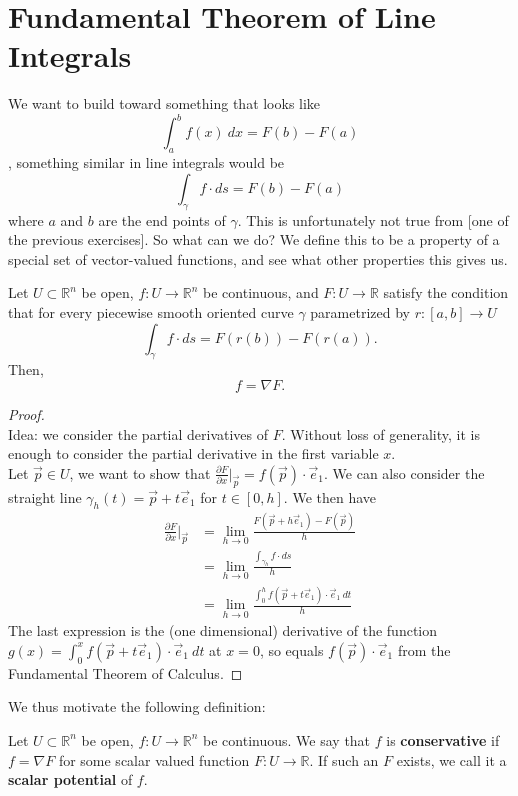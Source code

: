 \documentclass[11pt,openany]{book}
\newcommand{\definition}[2]{\begin{tcolorbox}[title=Definition ({#1}),colframe=black]{#2}\end{tcolorbox}
}
\newcommand{\proposition}[1]{\begin{tcolorbox}[title=Proposition,colframe=red!50!blue!20!white,colback=red!35!blue!10!white, coltitle=black]{#1}\end{tcolorbox}
}
\begin{document}
	\section*{Fundamental Theorem of Line Integrals}
	We want to build toward something that looks like 
	\[
		\int_{a}^{b} f(x) \ dx = F(b) - F(a)
	\], something similar in line integrals would be \[
		\int_\gamma f \cdot ds = F(b) - F(a)
	\] where $a$ and $b$ are the end points of $\gamma$. This is unfortunately not true from [one of the previous exercises]. So what can we do? We define this to be a property of a special set of vector-valued functions, and see what other properties this gives us.
	
	
	\proposition{
		Let $U\subset\mathbb{R}^n$ be open, $f:U\to\mathbb{R}^n$ be continuous, and $F:U\to\mathbb{R}$ satisfy the condition that for every piecewise smooth oriented curve $\gamma$ parametrized by $r: [a,b]\to U$
		\[
		\int_\gamma f \cdot ds = F(r(b)) - F(r(a)).
		\] 
		Then, \[
			f = \nabla F.
		\]
	}
	\begin{proof} \ \\
		Idea: we consider the partial derivatives of $F$. Without loss of generality, it is enough to consider the partial derivative in the first variable $x$. \\
		Let $\vec{p} \in U$, we want to show that $\frac{\partial F}{\partial x} \big| _{\vec{p}} = f(\vec{p}) \cdot \vec{e}_1$. We can also consider the straight line $\gamma_h(t) = \vec{p} + t\vec{e}_1$ for $t\in[0,h]$. We then have \begin{align*}
			\frac{\partial F}{\partial x} \big| _{\vec{p}} &= \lim_{h\to 0} \frac{F(\vec{p}+h\vec{e}_1)-F(\vec{p})}{h} \\
			&= \lim_{h\to 0} \frac{\int_{\gamma_h} f \cdot ds}{h}\\
			&= \lim_{h\to 0} \frac{\int_0^h f(\vec{p}+t\vec{e}_1) \cdot \vec{e}_1 \ dt}{h}
		\end{align*}
		The last expression is the (one dimensional) derivative of the function $g(x)=\int_0^x f(\vec{p}+t\vec{e}_1) \cdot \vec{e}_1 \ dt$ at $x=0$, so equals $f(\vec{p})\cdot \vec{e}_1$ from the Fundamental Theorem of Calculus.
	\end{proof}
	
	We thus motivate the following definition:
	\definition{Conservative Vector Fields}{
		Let $U\subset\mathbb{R}^n$ be open, $f:U\to\mathbb{R}^n$ be continuous. We say that $f$ is \textbf{conservative} if
		$f = \nabla F $ for some scalar valued function $F:U\to\mathbb{R}$.
		If such an $F$ exists, we call it a \textbf{scalar potential} of $f$.
	}
 
\end{document}
